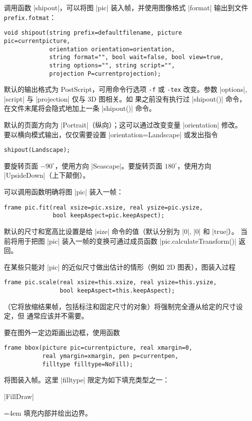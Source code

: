 \documentclass{ctexbook}
\makeatletter
\newenvironment{funclist}{\trivlist
  \parindent=0pt
\item[]
  \def\item{\medskip\par\leftskip=0pt}
  \def\go{\par\leftskip=4em}}
{\endtrivlist}
\newenvironment{typelist}{\itemize
  \let\old@item\@item
  \def\@item[##1]{\expandafter\old@item[\ttfamily\color{type!50!black}##1]}}
{\enditemize}
\newcommand*\prgname[1]{\textsf{#1}}
\makeatother
\begin{document}
\begin{typelist}
调用函数 |shipout|，可以将图 |pic| 装入帧，并使用图像格式 |format| 输出到文件
\verb=prefix.fotmat=：
\begin{lstlisting}
void shipout(string prefix=defaultfilename, picture pic=currentpicture,
             orientation orientation=orientation,
             string format="", bool wait=false, bool view=true,
             string options="", string script="",
             projection P=currentprojection);
\end{lstlisting}
默认的输出格式为 \prgname{PostScript}，可用命令行选项 \verb=-f= 或
\verb=-tex= 改变。参数 |options|, |script| 与 |projection| 仅与 3D 图相关。如
果之前没有执行过 |shipout()| 命令，在文件末尾将会隐式地加上一条 |shipout()| 
命令。

默认的页面方向为 |Portrait|（纵向）；这可以通过改变变量 |orientation| 修改。
要以横向模式输出，仅仅需要设置 |orientation=Landscape| 或发出指令
\begin{lstlisting}
shipout(Landscape);
\end{lstlisting}
要旋转页面 $-90^\circ$，使用方向 |Seascape|。要旋转页面 $180^\circ$，使用方向
|UpsideDown|（上下颠倒）。

可以调用函数明确将图 |pic| 装入一帧：
\begin{lstlisting}
frame pic.fit(real xsize=pic.xsize, real ysize=pic.ysize,
              bool keepAspect=pic.keepAspect);
\end{lstlisting}
默认的尺寸和宽高比设置是给 |size| 命令的值（默认分别为 |0|, |0| 和 |true|）。
当前将用于把图 |pic| 装入一帧的变换可通过成员函数
|pic.calculateTransform()| 返回。

在某些只能对 |pic| 的近似尺寸做出估计的情形（例如 2D 图表），图装入过程
\begin{lstlisting}
frame pic.scale(real xsize=this.xsize, real ysize=this.ysize,
                bool keepAspect=this.keepAspect);
\end{lstlisting}
（它将放缩结果帧，包括标注和固定尺寸的对象）将强制完全遵从给定的尺寸设定，但
通常应该并不需要。

要在图外一定边距画出边框，使用函数
\begin{lstlisting}
frame bbox(picture pic=currentpicture, real xmargin=0,
           real ymargin=xmargin, pen p=currentpen,
           filltype filltype=NoFill);
\end{lstlisting}
将图装入帧。这里 |filltype| 限定为如下填充类型之一：
\begin{funclist}
\item |FillDraw| \go
  填充内部并绘出边界。


\end{funclist}
\end{typelist}
\end{document}
